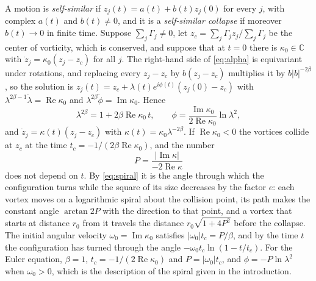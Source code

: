 \documentclass[11pt]{article}
\theoremstyle{definition}
\newcommand{\re}{\operatorname{Re}}
\newcommand{\im}{\operatorname{Im}}
\newcommand{\C}{\mathbb{C}}
\begin{document}
A motion is \emph{self-similar} if $z_j(t) = a(t) + b(t) z_j(0)$ for every $j$, with complex $a(t)$ and $b(t) \ne 0$, and it is a \emph{self-similar collapse} if moreover $b(t) \to 0$ in finite time. Suppose $\sum_j \Gamma_j \ne 0$, let $z_c = \sum_j \Gamma_j z_j / \sum_j \Gamma_j$ be the center of vorticity, which is conserved, and suppose that at $t = 0$ there is $\kappa_0 \in \C$ with $\dot z_j = \kappa_0 (z_j - z_c)$ for all $j$. The right-hand side of \eqref{eq:alpha} is equivariant under rotations, and replacing every $z_j - z_c$ by $b(z_j - z_c)$ multiplies it by $b|b|^{-2\beta}$, so the solution is $z_j(t) = z_c + \lambda(t) e^{i\phi(t)} (z_j(0) - z_c)$ with $\lambda^{2\beta - 1}\dot\lambda = \re\kappa_0$ and $\lambda^{2\beta}\dot\phi = \im\kappa_0$. Hence
\begin{equation}\label{eq:spiral}
  \lambda^{2\beta} = 1 + 2\beta \re\kappa_0\, t, \qquad \phi = \frac{\im\kappa_0}{2\re\kappa_0} \ln\lambda^2,
\end{equation}
and $\dot z_j = \kappa(t)(z_j - z_c)$ with $\kappa(t) = \kappa_0 \lambda^{-2\beta}$. If $\re\kappa_0 < 0$ the vortices collide at $z_c$ at the time $t_c = -1/(2\beta\re\kappa_0)$, and the number
\begin{equation}\label{eq:P}
  P = \frac{|\im\kappa|}{-2\re\kappa}
\end{equation}
does not depend on $t$. By \eqref{eq:spiral} it is the angle through which the configuration turns while the square of its size decreases by the factor $e$: each vortex moves on a logarithmic spiral about the collision point, its path makes the constant angle $\arctan 2P$ with the direction to that point, and a vortex that starts at distance $r_0$ from it travels the distance $r_0\sqrt{1 + 4P^2}$ before the collapse. The initial angular velocity $\omega_0 = \im\kappa_0$ satisfies $|\omega_0| t_c = P/\beta$, and by the time $t$ the configuration has turned through the angle $-\omega_0 t_c \ln(1 - t/t_c)$. For the Euler equation, $\beta = 1$, $t_c = -1/(2\re\kappa_0)$ and $P = |\omega_0| t_c$, and $\phi = -P\ln\lambda^2$ when $\omega_0 > 0$, which is the description of the spiral given in the introduction.
\end{document}
